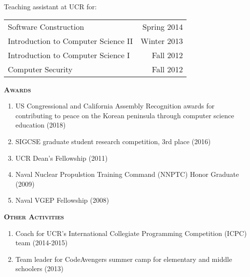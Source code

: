 \documentclass[12pt]{article}
\begin{document}
\newpage
\vspace{0.1in}
\noindent
Teaching assistant at UCR for:

\noindent
\begin{tabularx}{\textwidth}{Xr}
Software Construction & Spring 2014 \\
Introduction to Computer Science II & Winter 2013 \\
Introduction to Computer Science I  & Fall 2012 \\
Computer Security & Fall 2012 \\
\end{tabularx}


\vspace{0.15in}
\noindent
{{\scshape \bfseries {Awards}}}

\begin{enumerate}
\item US Congressional and California Assembly Recognition awards for contributing to peace on the Korean peninsula through computer science education (2018)

\item SIGCSE graduate student research competition, 3rd place (2016)

\item UCR Dean's Fellowship (2011)

\item Naval Nuclear Propulstion Training Command (NNPTC) Honor Graduate (2009)

\item Naval VGEP Fellowship (2008)
\end{enumerate}

\noindent
{{\scshape \bfseries {Other Activities}}}

\begin{enumerate}
\item
Coach for UCR's International Collegiate Programming Competition (ICPC) team (2014-2015)

\item
Team leader for CodeAvengers summer camp for elementary and middle schoolers (2013)
\end{enumerate}
\end{document}
